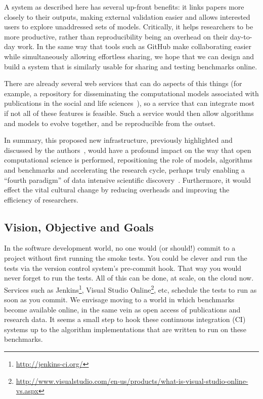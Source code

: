 \documentclass[a4paper,11pt]{article}
\begin{document}
A system as described here has several up-front benefits: it links
papers more closely to their outputs, making external validation
easier and allows interested users to explore unaddressed sets of
models. Critically, it helps researchers to be more productive, rather
than reproducibility being an overhead on their day-to-day work. In
the same way that tools such as GitHub make collaborating easier while
simultaneously allowing effortless sharing, we hope that we can design
and build a system that is similarly usable for sharing and testing
benchmarks online.

There are already several web services that can do aspects of this
things (for example, a repository for disseminating the computational
models associated with publications in the social and life
sciences~\cite{rollins-et-al:2014}), so a service that can integrate
most if not all of these features is feasible. Such a service would
then allow algorithms and models to evolve together, and be
reproducible from the outset.

In summary, this proposed new infrastructure, previously highlighted
and discussed by the
authors~\cite{crick-et-al_wssspe2,crick-et-al_recomp2014}, would have
a profound impact on the way that open computational science is
performed, repositioning the role of models, algorithms and benchmarks
and accelerating the research cycle, perhaps truly enabling a ``fourth
paradigm'' of data intensive scientific
discovery~\cite{hey:2009}. Furthermore, it would effect the vital
cultural change by reducing overheads and improving the efficiency of
researchers.

\subsection*{Vision, Objective and Goals}

In the software development world, no one would (or should!) commit to
a project without first running the smoke tests. You could be clever
and run the tests via the version control system's pre-commit
hook. That way you would never forget to run the tests. All of this
can be done, at scale, on the cloud now. Services such as
Jenkins\footnote{\url{http://jenkins-ci.org/}}, Visual Studio
Online\footnote{\url{http://www.visualstudio.com/en-us/products/what-is-visual-studio-online-vs.aspx}},
etc, schedule the tests to run as soon as you commit. We envisage
moving to a world in which benchmarks become available online, in the
same vein as open access of publications and research data. It seems a
small step to hook these continuous integration (CI) systems up to the
algorithm implementations that are written to run on these benchmarks.
\end{document}
